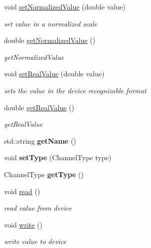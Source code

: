 \begin{DoxyCompactItemize}
\item 
void \hyperlink{classdrobot_1_1device_1_1channel_1_1Channel_a2e70ae236c4c8d84f496fae813b387df}{set\-Normalized\-Value} (double value)
\begin{DoxyCompactList}\small\item\em set value in a normalized scale \end{DoxyCompactList}\item 
double \hyperlink{classdrobot_1_1device_1_1channel_1_1Channel_a15332594079b2c71afe11c9dd3cc93ab}{get\-Normalized\-Value} ()
\begin{DoxyCompactList}\small\item\em get\-Normalized\-Value \end{DoxyCompactList}\item 
void \hyperlink{classdrobot_1_1device_1_1channel_1_1Channel_a0ed4b6ec85cf797be7d60bdd8dc4a727}{set\-Real\-Value} (double value)
\begin{DoxyCompactList}\small\item\em sets the value in the device recognizable format \end{DoxyCompactList}\item 
double \hyperlink{classdrobot_1_1device_1_1channel_1_1Channel_ac292e30111718032a812cc682ac75657}{get\-Real\-Value} ()
\begin{DoxyCompactList}\small\item\em get\-Real\-Value \end{DoxyCompactList}\item 
\hypertarget{classdrobot_1_1device_1_1channel_1_1Channel_a353f70634d7475c92625400912278978}{std\-::string {\bfseries get\-Name} ()}\label{classdrobot_1_1device_1_1channel_1_1Channel_a353f70634d7475c92625400912278978}

\item 
\hypertarget{classdrobot_1_1device_1_1channel_1_1Channel_ad8ad9f811ec340ac58df6f92ed7400a1}{void {\bfseries set\-Type} (Channel\-Type type)}\label{classdrobot_1_1device_1_1channel_1_1Channel_ad8ad9f811ec340ac58df6f92ed7400a1}

\item 
\hypertarget{classdrobot_1_1device_1_1channel_1_1Channel_aa7f53c1709e13a86c1aac1562e2d7f2a}{Channel\-Type {\bfseries get\-Type} ()}\label{classdrobot_1_1device_1_1channel_1_1Channel_aa7f53c1709e13a86c1aac1562e2d7f2a}

\item 
void \hyperlink{classdrobot_1_1device_1_1channel_1_1Channel_a47ef77f7b66378313f1bcf9111a770f7}{read} ()
\begin{DoxyCompactList}\small\item\em read value from device \end{DoxyCompactList}\item 
void \hyperlink{classdrobot_1_1device_1_1channel_1_1Channel_ab938866883805ed5e68377f3e964b62e}{write} ()
\begin{DoxyCompactList}\small\item\em write value to device \end{DoxyCompactList}\end{DoxyCompactItemize}

